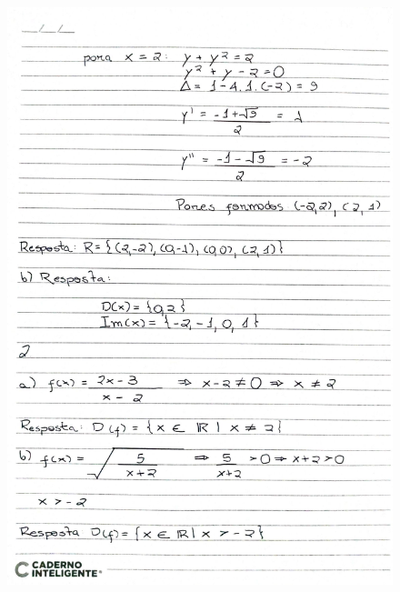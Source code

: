 \documentclass[
  12pt,     %
  openright,      %
  oneside,      %
  a4paper     %
  ]{abntex2}
\begin{document}
\begin{figure}[H]
  \centering
  \includegraphics[scale=0.23]{pagina2.jpg}
\end{figure}
\end{document}
